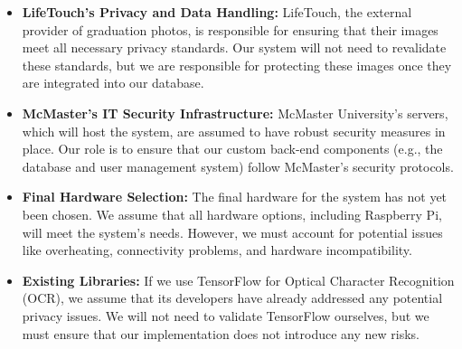 \documentclass{article}
\begin{document}
\begin{itemize}
  \item \textbf{LifeTouch’s Privacy and Data Handling:} LifeTouch, the external provider of graduation photos, is responsible for ensuring that their images meet all necessary privacy standards. Our system will not need to revalidate these standards, but we are responsible for protecting these images once they are integrated into our database.

  \item \textbf{McMaster’s IT Security Infrastructure:} McMaster University’s servers, which will host the system, are assumed to have robust security measures in place. Our role is to ensure that our custom back-end components (e.g., the database and user management system) follow McMaster’s security protocols.

  \item \textbf{Final Hardware Selection:} The final hardware for the system has not yet been chosen. We assume that all hardware options, including Raspberry Pi, will meet the system’s needs. However, we must account for potential issues like overheating, connectivity problems, and hardware incompatibility.

  \item \textbf{Existing Libraries:} If we use TensorFlow for Optical Character Recognition (OCR), we assume that its developers have already addressed any potential privacy issues. We will not need to validate TensorFlow ourselves, but we must ensure that our implementation does not introduce any new risks.
\end{itemize}
\end{document}
